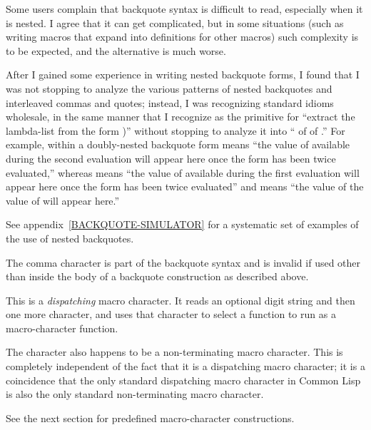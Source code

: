 \begin{flushdesc}

\begin{new}
Some users complain that backquote syntax is difficult to read,
especially when it is nested.  I agree that it can get complicated,
but in some situations (such as writing macros that expand into
definitions for other macros) such complexity is to be expected,
and the alternative is much worse.

After I gained some experience in writing nested backquote forms,
I found that I was not stopping to analyze the various patterns
of nested backquotes and interleaved commas and quotes; instead, I was
recognizing standard idioms wholesale, in the same manner that I recognize 
as the primitive for ``extract the lambda-list from the
form )'' without stopping to analyze it into
`` of  of .''  For example,  within
a doubly-nested backquote form means ``the value of  available
during the second evaluation
will appear here once the form has been twice
evaluated,'' whereas  means ``the value of  available during the
first evaluation will appear here once the form has been twice
evaluated'' and  means ``the value of the value of  will appear here.''

See appendix~\ref{BACKQUOTE-SIMULATOR} for a systematic set of examples
of the use of nested backquotes.
\end{new}

\item[\cd{,}]
The comma character is part of the backquote syntax
and is invalid if used other than inside the body of a backquote
construction as described above.

\item[\cd{\#}]
This is a \emph{dispatching} macro character.
It reads an optional digit string and then one more character,
and uses that character to select a function to run as a macro-character
function.

The \cd{\#} character also happens to be a non-terminating
macro character.  This is completely independent of the fact that
it is a dispatching macro character; it is a coincidence that
the only standard dispatching macro character in Common Lisp is
also the only standard non-terminating macro character.

See the next section for predefined \cd{\#} macro-character constructions.
\end{flushdesc}


